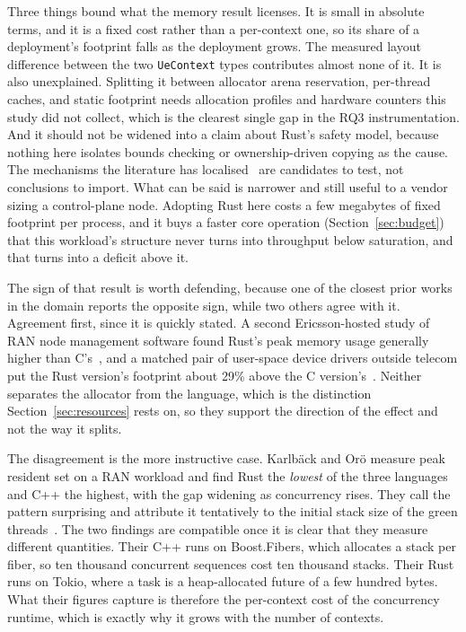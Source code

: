 \documentclass[english,oneside,a4paper,censored,csm,software-track-2020]{HYthesisML}
\begin{document}
Three things bound what the memory result licenses. It is small in absolute terms, and it is a
fixed cost rather than a per-context one, so its share of a deployment's footprint
falls as the deployment grows. The measured layout difference between the two
\texttt{UeContext} types contributes almost none of it. It is also unexplained. Splitting it
between allocator arena reservation, per-thread caches, and static footprint needs allocation
profiles and hardware counters this study did not collect, which is the clearest single gap in
the RQ3 instrumentation. And it should not be widened into a claim about Rust's safety
model, because nothing here isolates bounds checking or ownership-driven copying as the cause.
The mechanisms the literature has localised~\cite{zhang2022runtime,harris2023morello}
are candidates to test, not conclusions to import. What can be said is narrower and still
useful to a vendor sizing a control-plane node. Adopting Rust here costs a few megabytes of
fixed footprint per process, and it buys a faster core operation
(Section~\ref{sec:budget}) that this workload's structure never turns into throughput below
saturation, and that turns into a deficit above it.

The sign of that result is worth defending, because one of the closest prior works in the domain
reports the opposite sign, while two others agree with it. Agreement first, since it is quickly
stated. A second Ericsson-hosted study of RAN node management software found Rust's peak memory
usage generally higher than C's~\cite{olsson2023ranmgmt}, and a matched pair of user-space device
drivers outside telecom put the Rust version's footprint about 29\% above the C
version's~\cite{sundvisson2026drivers}. Neither separates the allocator from the language, which
is the distinction Section~\ref{sec:resources} rests on, so they support the direction of the
effect and not the way it splits.

The disagreement is the more instructive case. Karlb\"ack and Or\"o measure peak resident set on a RAN workload and
find Rust the \emph{lowest} of the three languages and C++ the highest, with the gap widening
as concurrency rises. They call the pattern surprising and attribute it tentatively to the initial
stack size of the green threads~\cite{karlback2021ran}. The two
findings are compatible once it is clear that they measure different quantities. Their C++ runs
on Boost.Fibers, which allocates a stack per fiber, so ten thousand concurrent sequences cost
ten thousand stacks. Their Rust runs on Tokio, where a task is a heap-allocated future of a few
hundred bytes. What their figures capture is therefore the per-context cost of the concurrency
runtime, which is exactly why it grows with the number of contexts.
\end{document}
